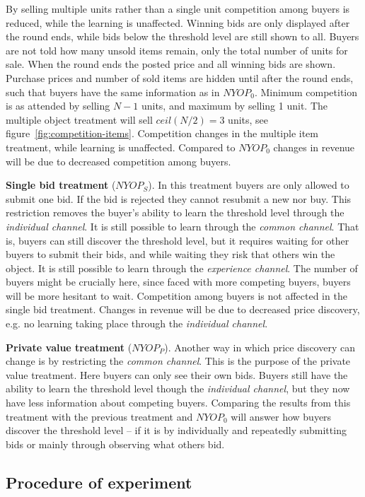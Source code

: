 \documentclass[a4paper,12pt]{article}
\begin{document}
	By selling multiple units rather than a single unit competition among buyers is reduced, while the learning is unaffected. Winning bids are only displayed after the round ends, while bids below the threshold level are still shown to all. Buyers are not told how many unsold items remain, only the total number of units for sale. When the round ends the posted price and all winning bids are shown. Purchase prices and number of sold items are hidden until after the round ends, such that buyers have the same information as in $NYOP_0$. Minimum competition is as attended by selling $N-1$ units, and maximum by selling 1 unit. The multiple object treatment will sell $ceil(N/2)=3$ units, see figure~\ref{fig:competition-items}. Competition changes in the multiple item treatment, while learning is unaffected. Compared to $NYOP_0$ changes in revenue will be due to decreased competition among buyers.

	{\bf Single bid treatment} ($NYOP_S$).
	In this treatment buyers are only allowed to submit one bid. If the bid is rejected they cannot resubmit a new nor buy. This restriction removes the buyer's ability to learn the threshold level through the \emph{individual channel}. It is still possible to learn through the \emph{common channel}. That is, buyers can still discover the threshold level, but it requires waiting for other buyers to submit their bids, and while waiting they risk that others win the object. It is still possible to learn through the \emph{experience channel}. The number of buyers might be crucially here, since faced with more competing buyers, buyers will be more hesitant to wait. Competition among buyers is not affected in the single bid treatment. Changes in revenue will be due to decreased price discovery, e.g. no learning taking place through the \emph{individual channel}.

	{\bf Private value treatment} ($NYOP_P$).
	Another way in which price discovery can change is by restricting the \emph{common channel}. This is the purpose of the private value treatment. Here buyers can only see their own bids. Buyers still have the ability to learn the threshold level though the \emph{individual channel}, but they now have less information about competing buyers. Comparing the results from this treatment with the previous treatment and $NYOP_0$ will answer how buyers discover the threshold level -- if it is by individually and repeatedly submitting bids or mainly through observing what others bid. 
	
	\subsection{Procedure of experiment}
	
\end{document}
